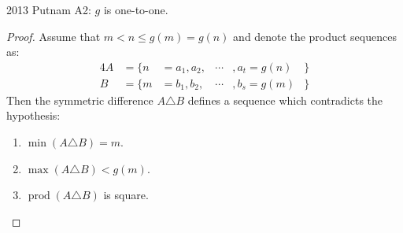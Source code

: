 \documentclass{beamer}
\begin{document}
%

\begin{frame}{2013 Putnam A2: $g$ is one-to-one.}
  \begin{proof}
    Assume that $m < n \leq g(m) = g(n)$ and denote the product sequences as:
    \begin{alignat*}{4}
      A &= \{n &= a_1 , a_2 , &\cdots &, a_t = g(n) &\} \\
      B &= \{m &= b_1 , b_2 , &\cdots &, b_s = g(m) &\}
    \end{alignat*}
    Then the symmetric difference $A \triangle B$ defines a sequence which
    contradicts the hypothesis: \begin{enumerate}
      \item $\min(A \triangle B) = m$.
      \item $\max(A \triangle B) < g(m)$.
      \item $\operatorname{prod}(A \triangle B)$ is square.
    \end{enumerate}
  \end{proof}
\end{frame}
\end{document}
